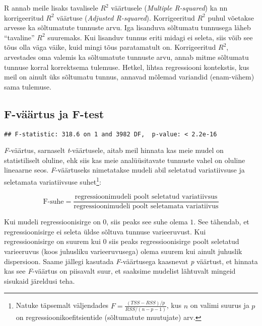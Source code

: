 \documentclass[
]{book}
\begin{document}
R annab meile lisaks tavalisele \(R^2\) väärtusele (\emph{Multiple R-squared}) ka nn korrigeeritud \(R^2\) väärtuse (\emph{Adjusted R-squared}). Korrigeeritud \(R^2\) puhul võetakse arvesse ka sõltumatute tunnuste arvu. Iga lisanduva sõltumatu tunnusega läheb ``tavaline'' \(R^2\) suuremaks. Kui lisanduv tunnus eriti midagi ei seleta, siis võib see tõus olla väga väike, kuid mingi tõus paratamatult on. Korrigeeritud \(R^2\), arvestades oma valemis ka sõltumatute tunnuste arvu, annab mitme sõltumatu tunnuse korral korrektsema tulemuse. Hetkel, lihtsa regressiooni kontekstis, kus meil on ainult üks sõltumatu tunnus, annavad mõlemad variandid (enam-vähem) sama tulemuse.

\hypertarget{f-vuxe4uxe4rtus-ja-f-test}{%
\subsection{F-väärtus ja F-test}\label{f-vuxe4uxe4rtus-ja-f-test}}

\begin{verbatim}
## F-statistic: 318.6 on 1 and 3982 DF,  p-value: < 2.2e-16
\end{verbatim}

\emph{F}-väärtus, sarnaselt \emph{t}-väärtusele, aitab meil hinnata kas meie mudel on statistiliselt oluline, ehk siis kas meie analüüsitavate tunnuste vahel on oluline lineaarne seos. \emph{F}-väärtuseks nimetatakse mudeli abil seletatud variatiivsuse ja seletamata variatiivsuse suhet\footnote{Natuke täpsemalt väljendades \(F = \frac{(TSS-RSS)/p}{RSS/(n-p-1)}\), kus \(n\) on valimi suurus ja \(p\) on regressioonikoefitsientide (sõltumatute muutujate) arv.}:

\begin{equation}
\text{F-suhe} = \frac{\text{regressioonimudeli poolt seletatud variatiivsus}}{\text{regressioonimudeli poolt seletamata variatiivus}}
\end{equation}

Kui mudeli regressioonisirge on \(0\), siis peaks see suhe olema \(1\). See tähendab, et regressioonisirge ei seleta üldse sõltuva tunnuse varieeruvust. Kui regressioonisirge on suurem kui \(0\) siis peaks regressioonisirge poolt seletatud varieeruvus (koos juhusliku varieeruvusega) olema suurem kui ainult juhuslik dispersioon. Saame jällegi kasutada \emph{F}-väärtusega kaasnevat \emph{p} väärtust, et hinnata kas see \emph{F}-väärtus on piisavalt suur, et saaksime mudelist lähtuvalt mingeid sisukaid järeldusi teha.
\end{document}

